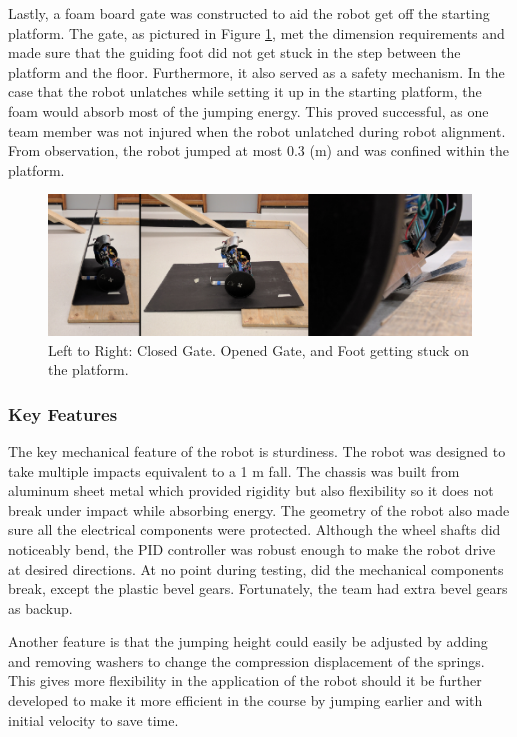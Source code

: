 \documentclass[ece]{uw-wkrpt}
\begin{document}
Lastly, a foam board gate was constructed to aid the robot get off the starting platform. The gate, as pictured in Figure \ref{fig:mech12}, met the dimension requirements and made sure that the guiding foot did not get stuck in the step between the platform and the floor. Furthermore, it also served as a safety mechanism. In the case that the robot unlatches while setting it up in the starting platform, the foam would absorb most of the jumping energy. This proved successful, as one team member was not injured when the robot unlatched during robot alignment. From observation, the robot jumped at most 0.3 (m) and was confined within the platform.

\begin{figure}
    \centering
    \includegraphics[width=5.5in]{res/mech12}
    \caption[Launch platform]
          {Left to Right: Closed Gate. Opened Gate, and Foot getting stuck on the platform.}
    \label{fig:mech12}
\end{figure}

\subsubsection{Key Features}

The key mechanical feature of the robot is sturdiness. The robot was designed to take multiple impacts equivalent to a 1 m fall. The chassis was built from aluminum sheet metal which provided rigidity but also flexibility so it does not break under impact while absorbing energy. The geometry of the robot also made sure all the electrical components were protected. Although the wheel shafts did noticeably bend, the PID controller was robust enough to make the robot drive at desired directions. At no point during testing, did the mechanical components break, except the plastic bevel gears. Fortunately, the team had extra bevel gears as backup.

Another feature is that the jumping height could easily be adjusted by adding and removing washers to change the compression displacement of the springs. This gives more flexibility in the application of the robot should it be further developed to make it more efficient in the course by jumping earlier and with initial velocity to save time.
\end{document}
